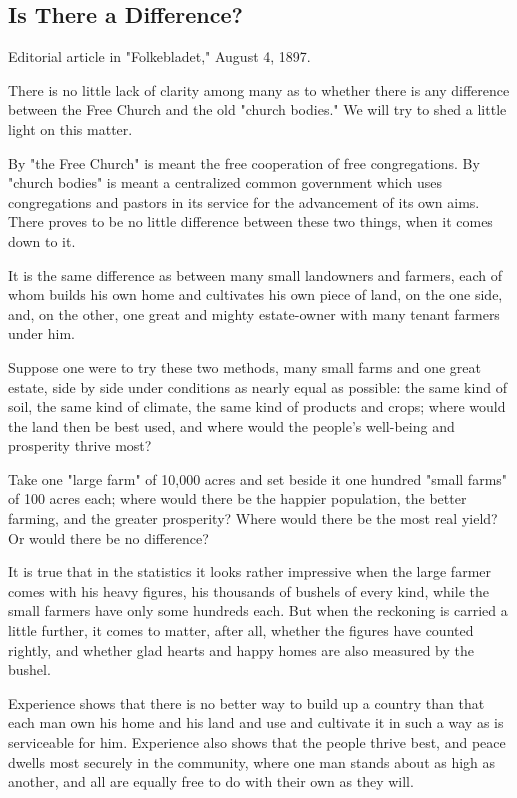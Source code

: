 
\subsection{Is There a Difference?}

Editorial article in "Folkebladet," August 4, 1897.

There is no little lack of clarity among many as to whether there is any difference between the Free Church and the old "church bodies." We will try to shed a little light on this matter.

By "the Free Church" is meant the free cooperation of free congregations. By "church bodies" is meant a centralized common government which uses congregations and pastors in its service for the advancement of its own aims. There proves to be no little difference between these two things, when it comes down to it.

It is the same difference as between many small landowners and farmers, each of whom builds his own home and cultivates his own piece of land, on the one side, and, on the other, one great and mighty estate-owner with many tenant farmers under him.

Suppose one were to try these two methods, many small farms and one great estate, side by side under conditions as nearly equal as possible: the same kind of soil, the same kind of climate, the same kind of products and crops; where would the land then be best used, and where would the people’s well-being and prosperity thrive most?

Take one "large farm" of 10,000 acres and set beside it one hundred "small farms" of 100 acres each; where would there be the happier population, the better farming, and the greater prosperity? Where would there be the most real yield? Or would there be no difference?

It is true that in the statistics it looks rather impressive when the large farmer comes with his heavy figures, his thousands of bushels of every kind, while the small farmers have only some hundreds each. But when the reckoning is carried a little further, it comes to matter, after all, whether the figures have counted rightly, and whether glad hearts and happy homes are also measured by the bushel.

Experience shows that there is no better way to build up a country than that each man own his home and his land and use and cultivate it in such a way as is serviceable for him. Experience also shows that the people thrive best, and peace dwells most securely in the community, where one man stands about as high as another, and all are equally free to do with their own as they will.

